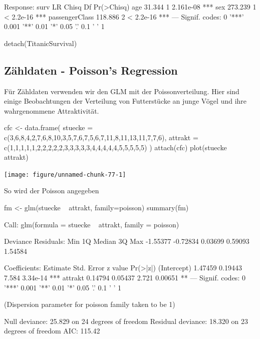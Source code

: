 \documentclass[a4paper,twoside]{tufte-book}\usepackage[]{graphicx}\usepackage[]{color}
\begin{document}
\begin{appendices}
\begin{Schunk}
\begin{Soutput}
Response: surv
               LR Chisq Df Pr(>Chisq)    
age              31.344  1  2.161e-08 ***
sex             273.239  1  < 2.2e-16 ***
passengerClass  118.886  2  < 2.2e-16 ***
---
Signif. codes:  0 '***' 0.001 '**' 0.01 '*' 0.05 '.' 0.1 ' ' 1
\end{Soutput}
\begin{Sinput}
detach(TitanicSurvival)
\end{Sinput}
\end{Schunk}

\subsection{Zähldaten - Poisson's Regression}

Für Zähldaten verwenden wir den GLM mit der Poissonverteilung. Hier sind einige Beobachtungen der Verteilung von Futterstücke an junge Vögel und ihre wahrgenommene Attraktivität.

\begin{Schunk}
\begin{Sinput}
cfc <- data.frame(
  stuecke = c(3,6,8,4,2,7,6,8,10,3,5,7,6,7,5,6,7,11,8,11,13,11,7,7,6),
  attrakt = c(1,1,1,1,1,2,2,2,2,2,3,3,3,3,3,4,4,4,4,4,5,5,5,5,5) 
)
attach(cfc)
plot(stuecke ~ attrakt)
\end{Sinput}

\texttt{[image: figure/unnamed-chunk-77-1]} \end{Schunk}


So wird der Poisson angegeben

\begin{Schunk}
\begin{Sinput}
fm <- glm(stuecke ~ attrakt, family=poisson)
summary(fm)
\end{Sinput}
\begin{Soutput}

Call:
glm(formula = stuecke ~ attrakt, family = poisson)

Deviance Residuals: 
     Min        1Q    Median        3Q       Max  
-1.55377  -0.72834   0.03699   0.59093   1.54584  

Coefficients:
            Estimate Std. Error z value Pr(>|z|)    
(Intercept)  1.47459    0.19443   7.584 3.34e-14 ***
attrakt      0.14794    0.05437   2.721  0.00651 ** 
---
Signif. codes:  0 '***' 0.001 '**' 0.01 '*' 0.05 '.' 0.1 ' ' 1

(Dispersion parameter for poisson family taken to be 1)

    Null deviance: 25.829  on 24  degrees of freedom
Residual deviance: 18.320  on 23  degrees of freedom
AIC: 115.42


\end{Soutput}
\end{Schunk}
\end{appendices}
\end{document}
